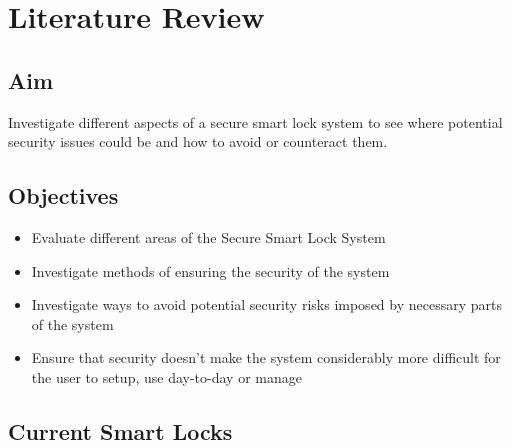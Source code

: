 \chapter{Literature Review}
\label{chap:literature_review}

\section{Aim}
Investigate different aspects of a secure smart lock system to see where potential security issues could be and how to avoid or counteract them.
\section{Objectives}
\begin{itemize}
	\item {Evaluate different areas of the Secure Smart Lock System}
	\item Investigate methods of ensuring the security of the system
	\item Investigate ways to avoid potential security risks imposed by necessary parts of the system
	\item Ensure that security doesn't make the system considerably more difficult for the user to setup, use day-to-day or manage
\end{itemize}

\section{Current Smart Locks}

